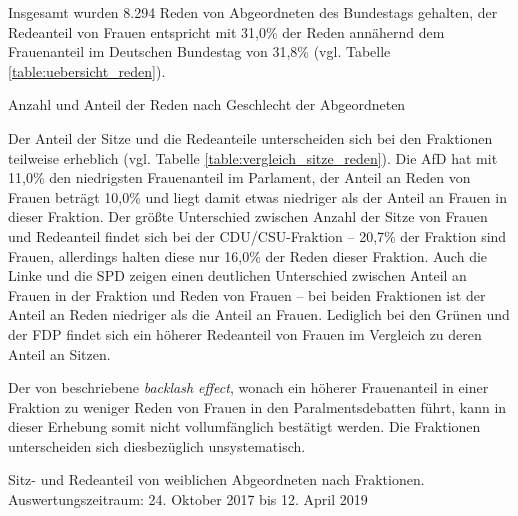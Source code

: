 \documentclass[12pt, 
    twoside=false, 
    bibliography=totoc, 
    numbers=endperiod, 
    headings=normal, 
    toc=chapterentrydotfill
    ]{scrbook}
\begin{document}
Insgesamt wurden 8.294 Reden von Abgeordneten des Bundestags gehalten, der Redeanteil von Frauen entspricht mit 31,0\% der Reden annähernd dem Frauenanteil im Deutschen Bundestag von 31,8\% (vgl. Tabelle \ref{table:uebersicht_reden}).

\begin{table}[htb]
    \centering
    \caption{Anzahl und Anteil der Reden nach Geschlecht der Abgeordneten}
    
    \label{table:uebersicht_reden}
\end{table}

Der Anteil der Sitze und die Redeanteile unterscheiden sich bei den Fraktionen teilweise erheblich (vgl. Tabelle \ref{table:vergleich_sitze_reden}). Die AfD hat mit 11,0\% den niedrigsten Frauenanteil im Parlament, der Anteil an Reden von Frauen beträgt 10,0\% und liegt damit etwas niedriger als der Anteil an Frauen in dieser Fraktion. 
Der größte Unterschied zwischen Anzahl der Sitze von Frauen und Redeanteil findet sich bei der CDU/CSU-Fraktion -- 20,7\% der Fraktion sind Frauen, allerdings halten diese nur 16,0\% der Reden dieser Fraktion. Auch die Linke und die SPD zeigen  einen deutlichen Unterschied zwischen Anteil an Frauen in der Fraktion und Reden von Frauen -- bei beiden Fraktionen ist der Anteil an Reden niedriger als die Anteil an Frauen. Lediglich bei den Grünen und der FDP findet sich ein höherer Redeanteil von Frauen im Vergleich zu deren Anteil an Sitzen.

Der von \textcite{back_2018} beschriebene \emph{backlash effect}, wonach ein höherer Frauenanteil in einer Fraktion zu weniger Reden von Frauen in den Paralmentsdebatten führt, kann in dieser Erhebung somit nicht vollumfänglich bestätigt werden. Die Fraktionen unterscheiden sich diesbezüglich unsystematisch. 

\begin{table}[htb]
    \centering
    \caption[Sitz- und Redeanteil von weiblichen Abgeordneten nach Fraktionen]{Sitz- und Redeanteil von weiblichen Abgeordneten nach Fraktionen. Auswertungszeitraum: 24. Oktober 2017 bis 12. April 2019}
    
    \label{table:vergleich_sitze_reden}
\end{table}
\end{document}
